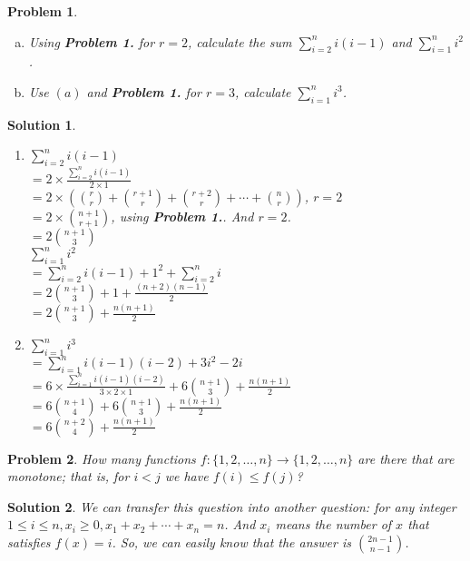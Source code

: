 \documentclass[12pt]{article}
\newtheorem*{solution}{Solution}
\newtheorem{hw}{Problem}
\begin{document}
\begin{hw}
\begin{enumerate}[(a)]
\item Using \emph{\textbf{Problem 1.}} for $r=2$, calculate the sum $\sum_{i=2}^n i(i-1)$ and $\sum_{i=1}^n i^2$.
\item Use $(a)$ and \emph{\textbf{Problem 1.}}  for $r=3$, calculate $\sum_{i=1}^n i^3$.
\end{enumerate}
\end{hw}

\begin{solution}
    \begin{enumerate}
        \item $\sum_{i=2}^n i(i-1)$
        \\$=2\times \frac{\sum_{i=2}^n i(i-1)}{2\times 1}$
        \\$=2\times ({r\choose r} +{r+1 \choose r}+{r+2 \choose r}+\cdots+{n\choose r})$, $r=2$
        \\$=2\times {n+1\choose r+1}$, using \textbf{Problem 1.}. And $r=2$.
        \\$=2{n+1\choose 3}$
        \\$\sum_{i=1}^n i^2$
        \\$=\sum_{i=2}^n i(i-1)+1^2+\sum_{i=2}^n i$
        \\$=2{n+1\choose 3}+1+\frac{(n+2)(n-1)}{2}$
        \\$=2{n+1\choose 3}+\frac{n(n+1)}{2}$
        \item $\sum_{i=1}^n i^3$
        \\$=\sum_{i=1}^n i(i-1)(i-2)+3i^2-2i$
        \\$=6\times \frac{\sum_{i=1}^n i(i-1)(i-2)}{3\times 2\times 1}+6{n+1\choose 3}+\frac{n(n+1)}{2}$
        \\$=6{n+1\choose 4}+6{n+1\choose 3}+\frac{n(n+1)}{2}$
        \\$=6{n+2\choose 4}+\frac{n(n+1)}{2}$
    \end{enumerate}
\end{solution}

\begin{hw}
How many functions $f:\{1,2,\ldots, n\}\rightarrow \{1,2,\ldots, n\}$ are there that are \emph{monotone}; that is, for $i<j$ we have $f(i)\leq f(j)$?
\end{hw}

\begin{solution}
    We can transfer this question into another question: for any integer $1\leqslant i\leqslant n, x_i\geqslant 0, x_1+x_2+\cdots +x_n=n$. And $x_i$ means the number of $x$ that satisfies $f(x)=i$. So, we can easily know that the answer is ${2n-1\choose n-1}$.
\end{solution}
\end{document}
